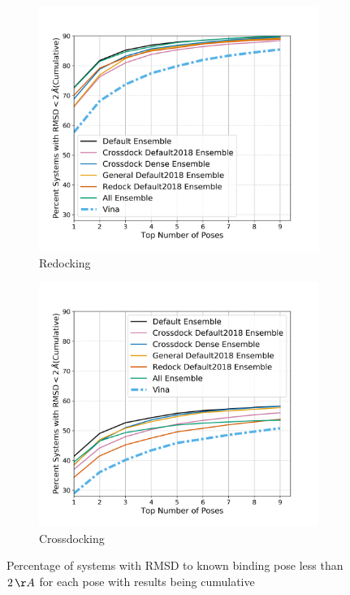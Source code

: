 \documentclass[journal=jcisd8,manuscript=article]{achemso}
\begin{document}
\begin{figure}
	\begin{subfigure}[b]{0.48\textwidth}
		\centering
		\includegraphics[width=\textwidth]{figures/redocking/rescore_ensembles_line.png}
		\caption{Redocking}
		\label{fig:resc ens rd}
        \end{subfigure}    
	\begin{subfigure}[b]{0.48\textwidth} 
		\centering
		\includegraphics[width=\textwidth]{figures/crossdocking/rescore_ensembles_line.png}
		\caption{Crossdocking}
		\label{fig:resc ens cd}
        \end{subfigure}    
	\caption{Percentage of systems with RMSD to known binding pose less than $2\,\AA$ for each pose with results being cumulative}
	\label{fig:resc ens}
\end{figure}    
\end{document}
